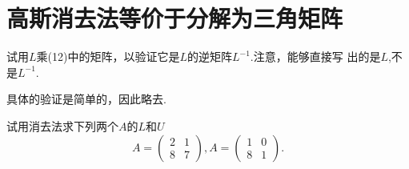 ﻿\documentclass{book} \usepackage{exsheets} \usepackage{xeCJK}
\begin{document}
\section{高斯消去法等价于分解为三角矩阵}
\begin{question}
  试用$L$乘(12)中的矩阵，以验证它是$L$的逆矩阵$L^{-1}$.注意，能够直接写
  出的是$L$,不是$L^{-1}$.
\end{question}
\begin{solution}
  具体的验证是简单的，因此略去.
\end{solution}
\begin{question}
  试用消去法求下列两个$A$的$L$和$U$
$$
A=
\begin{pmatrix}
  2&1\\
  8&7
\end{pmatrix},A=
\begin{pmatrix}
  1&0\\
  8&1
\end{pmatrix}.
$$
\end{question}
\end{document}

